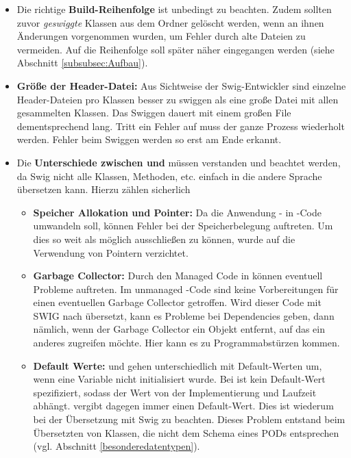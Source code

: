 \begin{itemize}
\item Die richtige \textbf{Build-Reihenfolge} ist unbedingt zu beachten. Zudem sollten zuvor \emph{geswiggte} Klassen aus dem Ordner gelöscht werden, wenn an ihnen Änderungen vorgenommen wurden, um Fehler durch alte Dateien zu vermeiden. Auf die Reihenfolge soll später näher eingegangen werden (siehe Abschnitt \ref{subsubsec:Aufbau}).
\item \textbf{Größe der Header-Datei:} Aus Sichtweise der Swig-Entwickler sind einzelne Header-Dateien pro Klassen besser zu swiggen als eine große Datei mit allen gesammelten Klassen. Das Swiggen dauert mit einem großen File dementsprechend lang. Tritt ein Fehler auf muss der ganze Prozess wiederholt werden. Fehler beim Swiggen werden so erst am Ende erkannt. %
\item Die \textbf{Unterschiede zwischen \CC und \CS} müssen verstanden und beachtet werden, da Swig nicht alle Klassen, Methoden, etc. einfach in die andere Sprache übersetzen kann. Hierzu zählen sicherlich 
	\begin{itemize}
	\item \textbf{Speicher Allokation und Pointer:}
	Da die Anwendung \CC - in \CS -Code umwandeln soll, können Fehler bei der Speicherbelegung auftreten. Um dies so weit als möglich ausschließen zu können, wurde auf die Verwendung von Pointern verzichtet.
	\item \textbf{Garbage Collector:} Durch den Managed Code in \CS können eventuell Probleme auftreten. Im unmanaged \CC -Code sind keine Vorbereitungen für einen eventuellen Garbage Collector getroffen. Wird dieser Code mit SWIG nach \CS übersetzt, kann es Probleme bei Dependencies geben, dann nämlich, wenn der Garbage Collector ein Objekt entfernt, auf das ein anderes zugreifen möchte. Hier kann es zu Programmabstürzen kommen.
	\item \textbf{Default Werte:} \CC und \CS gehen unterschiedlich mit Default-Werten um, wenn eine Variable nicht initialisiert wurde. Bei \CC ist kein Default-Wert spezifiziert, sodass der Wert von der Implementierung und Laufzeit abhängt. \CS vergibt dagegen immer einen Default-Wert. Dies ist wiederum bei der Übersetzung mit Swig zu beachten. Dieses Problem entstand beim Übersetzten von Klassen, die nicht dem Schema eines PODs entsprechen (vgl. Abschnitt \ref{besonderedatentypen}).

\end{itemize}
\end{itemize}
